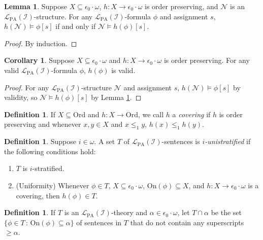 \documentclass[reqno]{article}
\theoremstyle{definition}
\newtheorem{lemma}[theorem]{Lemma}
\newtheorem{corollary}[theorem]{Corollary}
\newtheorem{definition}[theorem]{Definition}
\def\L{\mathscr{L}}
\def\LPA{\L_{\mathrm{PA}}}
\def\Ord{\mathrm{Ord}}
\def\epom{\epsilon_0\cdot\omega}
\def\indset{\mathcal I}
\def\onset{\mathrm{On}}
\begin{document}
\begin{lemma}
\label{hcommutativitylemma}
Suppose $X\subseteq\epom$, $h:X\to\epom$ is order preserving,
and $\mathscr N$ is an $\LPA(\indset)$-structure.
For any $\LPA(\indset)$-formula $\phi$
and assignment $s$,
$h(\mathscr N)\models\phi[s]$
if and only if $\mathscr N\models h(\phi)[s]$.
\end{lemma}



\begin{proof}
By induction.
\end{proof}

\begin{corollary}
\label{hpreserversvalidity}
Suppose $X\subseteq\epom$ and $h:X\to\epom$ is order preserving.
For any valid $\LPA(\indset)$-formula $\phi$,
$h(\phi)$ is valid.
\end{corollary}

\begin{proof}
For any $\LPA(\indset)$-structure $\mathscr N$ and assignment $s$,
$h(\mathscr N)\models\phi[s]$ by validity, so $\mathscr N\models h(\phi)[s]$
by Lemma \ref{hcommutativitylemma}.
\end{proof}

\begin{definition}
If $X\subseteq\Ord$ and $h:X\to\Ord$, we call $h$ a \emph{covering}
if $h$ is order preserving and whenever $x,y\in X$
and $x\leq_1 y$, $h(x)\leq_1 h(y)$.
\end{definition}

\begin{definition}
Suppose $i\in\omega$.
A set $T$ of $\LPA(\indset)$-sentences is \emph{$i$-unistratified}
if the following conditions hold:
\begin{enumerate}
\item $T$ is $i$-stratified.
\item (Uniformity) Whenever $\phi\in T$,
$X\subseteq\epom$, $\onset(\phi)\subseteq X$, and $h:X\to\epom$ is a covering,
then $h(\phi)\in T$.
\end{enumerate}
\end{definition}

\begin{definition}
If $T$ is an $\LPA(\indset)$-theory and $\alpha\in\epom$,
let $T\cap\alpha$ be the set $\{\phi\in T\,:\,\onset(\phi)\subseteq\alpha\}$ of sentences in $T$ that do not contain
any superscripts $\geq\alpha$.
\end{definition}
\end{document}
